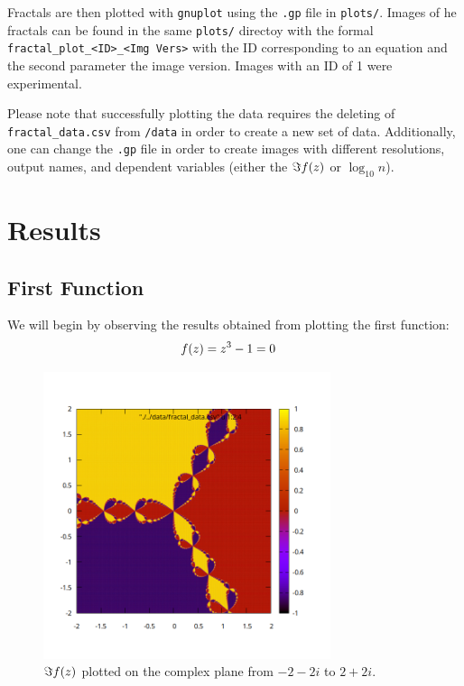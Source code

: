 \documentclass[12pt]{article}
\DeclarePairedDelimiter\rb{(}{)}
\begin{document}
Fractals are then plotted with \texttt{gnuplot} using the \texttt{.gp} file in \texttt{plots/}. Images of he fractals can be found in the same \texttt{plots/} directoy with the formal \texttt{fractal_plot_<ID>_<Img Vers>} with the ID corresponding to an equation and the second parameter the image version. Images with an ID of 1 were experimental.

Please note that successfully plotting the data requires the deleting of \texttt{fractal_data.csv} from \texttt{/data} in order to create a new set of data. Additionally, one can change the \texttt{.gp} file in order to create images with different resolutions, output names, and dependent variables (either the \(\Im f\rb*{z}\) or \(\log_{10} n\)).

\section{Results}
\label{sec:results}

\subsection{First Function}
\label{subsec:first}



We will begin by observing the results obtained from plotting the first function:
\begin{align*}
	f\rb*{z} & =  z^{3} - 1 = 0 &\\
\end{align*}

     \begin{figure}[ht]
    \centering
    \includegraphics[width=0.75\textwidth]{./../problem04/plots/fractal_plot-02_01.png}
    \caption{\( \Im f\rb*{z}\) plotted on the complex plane from \(-2 -2i\) to \(2 + 2i\).}
    \label{fig:02_01}
\end{figure}
\end{document}
